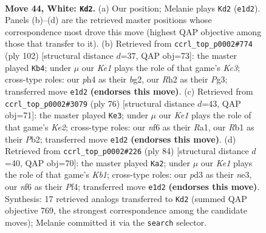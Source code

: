 \documentclass[11pt]{article}
\begin{document}
\clearpage

\begin{figure}[p]\centering
\begin{subfigure}{0.46\textwidth}\centering
\resizebox{\linewidth}{!}{%
\newchessgame
\chessboard[
  setfen={7k/5p2/5n1B/8/p3p2p/3p3P/PP3P1R/1R2K1r1 w - - 1 44},
  showmover=false,
  pgfstyle=straightmove, color=movearrow, markmove={e1-d2}
]}
\caption{}
\end{subfigure}\hfill
\begin{subfigure}{0.46\textwidth}\centering
\resizebox{\linewidth}{!}{%
\newchessgame
\chessboard[
  setfen={3k4/5pp1/4p2p/1PR1P3/3N2P1/r1K3P1/6b1/8 w - - 1 52},
  showmover=false,
  pgfstyle=straightmove, color=movearrow, markmove={c3-b4}
]}
\caption{}
\end{subfigure}
\\[4pt]
\begin{subfigure}{0.46\textwidth}\centering
\resizebox{\linewidth}{!}{%
\newchessgame
\chessboard[
  setfen={3r4/1p4k1/p3p3/1p6/4PR2/1P3P2/1Pr1K3/R7 w - - 1 39},
  showmover=false,
  pgfstyle=straightmove, color=movearrow, markmove={e2-e3}
]}
\caption{}
\end{subfigure}\hfill
\begin{subfigure}{0.46\textwidth}\centering
\resizebox{\linewidth}{!}{%
\newchessgame
\chessboard[
  setfen={5k2/3B1p1p/1p4p1/6P1/1P1R1P1P/1r2n3/8/1K6 w - - 0 43},
  showmover=false,
  pgfstyle=straightmove, color=movearrow, markmove={b1-a2}
]}
\caption{}
\end{subfigure}
\caption{\textbf{Move 44, White: \texttt{Kd2}.} (a) Our position; Melanie plays \texttt{Kd2} (\texttt{e1d2}). Panels (b)--(d) are the retrieved master positions whose correspondence most drove this move (highest QAP objective among those that transfer to it). (b) Retrieved from \texttt{ccrl\_top\_p0002\#774} (ply 102) [structural distance $d$=37, QAP obj=73]: the master played \texttt{Kb4}; under $\mu$ our \emph{Ke1} plays the role of that game's \emph{Kc3}; cross-type roles: our \emph{p}h4 as their \emph{b}g2, our \emph{R}h2 as their \emph{P}g3; transferred move \texttt{e1d2} \textbf{(endorses this move)}. (c) Retrieved from \texttt{ccrl\_top\_p0002\#3079} (ply 76) [structural distance $d$=43, QAP obj=71]: the master played \texttt{Ke3}; under $\mu$ our \emph{Ke1} plays the role of that game's \emph{Ke2}; cross-type roles: our \emph{n}f6 as their \emph{R}a1, our \emph{R}b1 as their \emph{P}b2; transferred move \texttt{e1d2} \textbf{(endorses this move)}. (d) Retrieved from \texttt{ccrl\_top\_p0002\#226} (ply 84) [structural distance $d$=40, QAP obj=70]: the master played \texttt{Ka2}; under $\mu$ our \emph{Ke1} plays the role of that game's \emph{Kb1}; cross-type roles: our \emph{p}d3 as their \emph{n}e3, our \emph{n}f6 as their \emph{P}f4; transferred move \texttt{e1d2} \textbf{(endorses this move)}. Synthesis: 17 retrieved analogs transferred to \texttt{Kd2} (summed QAP objective 769, the strongest correspondence among the candidate moves); Melanie committed it via the \texttt{search} selector.}
\label{fig:thought-m86}
\end{figure}
\end{document}
